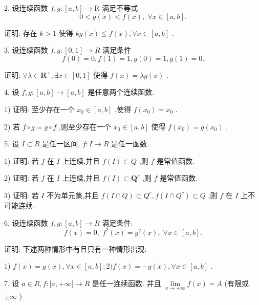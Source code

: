 2. 设连续函数 $f,g : \left\lbrack  {a,b}\right\rbrack   \rightarrow  \mathrm{R}$ 满足不等式
$$0 < g\left( x\right)  < f\left( x\right) ,\;\forall x \in  \left\lbrack  {a,b}\right\rbrack  .$$

证明: 存在 $k > 1$ 使得 ${kg}\left( x\right)  \leq  f\left( x\right) ,\forall x \in  \left\lbrack  {a,b}\right\rbrack$ .

3. 设连续函数 $f,g : \left\lbrack  {0,1}\right\rbrack   \rightarrow  R$ 满足条件
$$f\left( 0\right)  = 0,f\left( 1\right)  = 1,g\left( 0\right)  = 1,g\left( 1\right)  = 0.$$

证明: $\forall \lambda  \in  {\mathbf{R}}^{ + },\exists x \in  \left\lbrack  {0,1}\right\rbrack$ 使得 $f\left( x\right)  = {\lambda g}\left( x\right)$ .

4. 设 $f,g : \left\lbrack  {a,b}\right\rbrack   \rightarrow  \left\lbrack  {a,b}\right\rbrack$ 是任意两个连续函数.

1) 证明: 至少存在一个 ${x}_{0} \in  \left\lbrack  {a,b}\right\rbrack$ ,使得 $f\left( {x}_{0}\right)  = {x}_{0}$ .

2) 若 $f \circ  g = g \circ  f$ ,则至少存在一个 ${x}_{0} \in  \left\lbrack  {a,b}\right\rbrack$ 使得 $f\left( {x}_{0}\right)  = g\left( {x}_{0}\right)$ .

5. 设 $I \subset  R$ 是任一区间, $f : I \rightarrow  R$ 是任一函数.

1) 证明: 若 $f$ 在 $I$ 上连续,并且 $f\left( I\right)  \subset  Q$ ,则 $f$ 是常值函数.

2) 证明: 若 $f$ 在 $I$ 上连续,并且 $f\left( I\right)  \subset  {\mathbf{Q}}^{c}$ ,则 $f$ 是常值函数.

3) 证明: 若 $I$ 不为单元集,并且 $f\left( {I \cap  Q}\right)  \subset  {Q}^{c},f\left( {I \cap  {Q}^{c}}\right)  \subset  Q$ ,则 $f$ 在 $I$ 上不可能连续.

6. 设连续函数 $f,g : \left\lbrack  {a,b}\right\rbrack   \rightarrow  R$ 满足条件:
$$f\left( x\right)  = 0,\;{f}^{2}\left( x\right)  = {g}^{2}\left( x\right) ,\;\forall x \in  \left\lbrack  {a,b}\right\rbrack  .$$

证明: 下述两种情形中有且只有一种情形出现:

1) $f\left( x\right)  = g\left( x\right) ,\forall x \in  \left\lbrack  {a,b}\right\rbrack  ;2)f\left( x\right)  =  - g\left( x\right) ,\forall x \in  \left\lbrack  {a,b}\right\rbrack$ .

7. 设 $a \in  R,f : \lbrack a, + \infty \lbrack  \rightarrow  R$ 是任一连续函数. 并且 $\mathop{\lim }\limits_{{x \rightarrow   + \infty }}f\left( x\right)  = A$ (有限或 $\pm  \infty$ )

